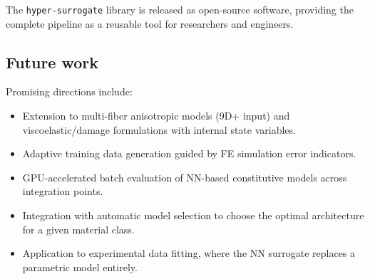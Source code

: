 The \texttt{hyper-surrogate} library is released as open-source software,
providing the complete pipeline as a reusable tool for researchers and
engineers.

\subsection{Future work}

Promising directions include:
\begin{itemize}
  \item Extension to multi-fiber anisotropic models (9D+ input) and
    viscoelastic/damage formulations with internal state variables.
  \item Adaptive training data generation guided by FE simulation error
    indicators.
  \item GPU-accelerated batch evaluation of NN-based constitutive models
    across integration points.
  \item Integration with automatic model selection to choose the optimal
    architecture for a given material class.
  \item Application to experimental data fitting, where the NN surrogate
    replaces a parametric model entirely.
\end{itemize}
